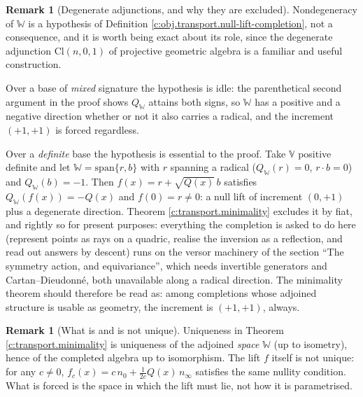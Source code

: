 \documentclass[11pt]{article}
\theoremstyle{definition}
\newtheorem{remark}[theorem]{Remark}
\theoremstyle{plain}
\providecommand{\Cl}{}\renewcommand{\Cl}{\mathrm{Cl}}
\providecommand{\nInf}{}\renewcommand{\nInf}{n_\infty}
\providecommand{\nO}{}\renewcommand{\nO}{n_0}
\begin{document}
\begin{remark}[Degenerate adjunctions, and why they are excluded]\label{c:note.transport.degenerate-adjunctions-why-they-are-excluded}
Nondegeneracy of $\mathbb{W}$ is a hypothesis of Definition \ref{c:obj.transport.null-lift-completion}, not a consequence, and it is worth being exact about its role, since the degenerate adjunction $\Cl(n,0,1)$ of projective geometric algebra is a familiar and useful construction.

Over a base of \emph{mixed} signature the hypothesis is idle: the parenthetical second argument in the proof shows $Q_{\mathbb{W}}$ attains both signs, so $\mathbb{W}$ has a positive and a negative direction whether or not it also carries a radical, and the increment $(+1,+1)$ is forced regardless.

Over a \emph{definite} base the hypothesis is essential to the proof. Take $\mathbb{V}$ positive definite and let $\mathbb{W} = \mathrm{span}\{r, b\}$ with $r$ spanning a radical ($Q_{\mathbb{W}}(r) = 0$, $r \cdot b = 0$) and $Q_{\mathbb{W}}(b) = -1$. Then $f(x) = r + \sqrt{Q(x)}\,b$ satisfies $Q_{\mathbb{W}}(f(x)) = -Q(x)$ and $f(0) = r \neq 0$: a null lift of increment $(0,+1)$ plus a degenerate direction. Theorem \ref{c:transport.minimality} excludes it by fiat, and rightly so for present purposes: everything the completion is asked to do here (represent points as rays on a quadric, realise the inversion as a reflection, and read out answers by descent) runs on the versor machinery of the section ``The symmetry action, and equivariance'', which needs invertible generators and Cartan--Dieudonn\'e, both unavailable along a radical direction. The minimality theorem should therefore be read as: among completions whose adjoined structure is usable as geometry, the increment is $(+1,+1)$, always.
\end{remark}

\begin{remark}[What is and is not unique]\label{c:note.transport.what-not-unique}
Uniqueness in Theorem \ref{c:transport.minimality} is uniqueness of the adjoined \emph{space} $\mathbb{W}$ (up to isometry), hence of the completed algebra up to isomorphism. The lift $f$ itself is not unique: for any $c \neq 0$, $f_c(x) = c\,\nO + \tfrac{1}{2c} Q(x)\,\nInf$ satisfies the same nullity condition. What is forced is the space in which the lift must lie, not how it is parametrised.
\end{remark}
\end{document}
